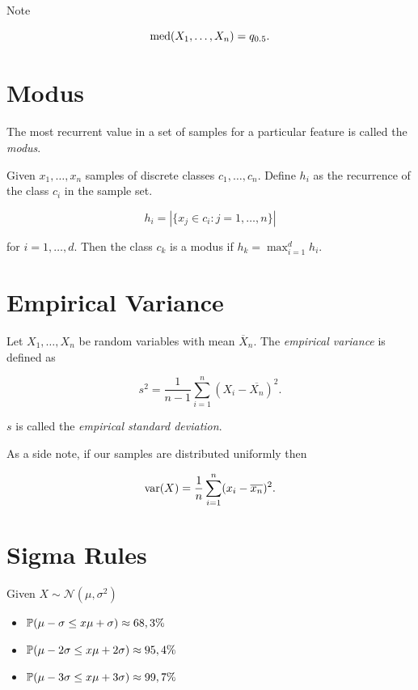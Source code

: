 Note 

\[
    \mathrm{med}(X_1, \dots, X_n) = q_{0.5}.
\]

\section{Modus}

The most recurrent value in a set of samples for a particular feature is called the \emph{modus}. 

Given \(x_1, \dots, x_n\) samples of discrete classes \(c_1, \dots, c_n\). Define \(h_i\) as the 
recurrence of the class \(c_i\) in the sample set. 

\[
    h_i = |\{x_j \in c_i : j = 1, \dots, n\}|
\]

for \(i = 1, \dots, d\). Then the class \(c_k\) is a modus if \(h_k = \max_{i = 1}^{d} h_i\).

\section{Empirical Variance}

Let \(X_1, \ldots, X_n\) be random variables with mean \(\overline{X}_n\). 
The \emph{empirical variance} is defined as

\[
    s^2 = \frac{1}{n - 1} \sum_{i = 1}^{n}(X_i - \overline{X_n})^2.
\]

\(s\) is called the \emph{empirical standard deviation}.

As a side note, if our samples are distributed uniformly then 

\[
    \mathrm{var}(X) = \frac{1}{n}\sum_{i = 1}^{n} (x_i - \overline{x_n})^2.
\]

\section{Sigma Rules}

Given \(X \sim \mathcal{N}(\mu, \sigma^2)\)

\begin{itemize}

    \item \(\mathbb{P}(\mu - \sigma \le x \mu + \sigma) \approx 68,3\%\)

    \item \(\mathbb{P}(\mu - 2\sigma \le x \mu + 2\sigma) \approx 95,4\%\)

    \item \(\mathbb{P}(\mu - 3\sigma \le x \mu + 3\sigma) \approx 99,7\%\)

\end{itemize}

